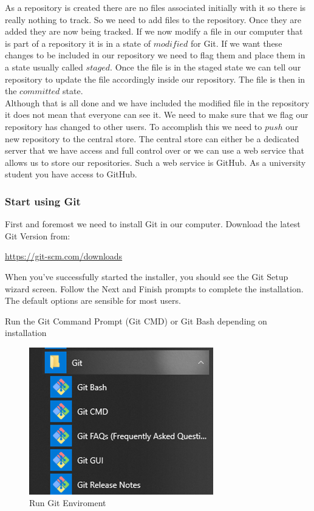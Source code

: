 \documentclass[
]{book}
\begin{document}
As a repository is created there are no files associated initially with it so there is really nothing to track. So we need to add files to the repository. Once they are added they are now being tracked. If we now modify a file in our computer that is part of a repository it is in a state of \(modified\) for Git. If we want these changes to be included in our repository we need to flag them and place them in a state usually called \(staged\). Once the file is in the staged state we can tell our repository to update the file accordingly inside our repository. The file is then in the \(committed\) state.\\
Although that is all done and we have included the modified file in the repository it does not mean that everyone can see it. We need to make sure that we flag our repository has changed to other users. To accomplish this we need to \(push\) our new repository to the central store.
The central store can either be a dedicated server that we have access and full control over or we can use a web service that allows us to store our repositories. Such a web service is GitHub.
As a university student you have access to GitHub.

\hypertarget{start-using-git}{%
\subsubsection*{Start using Git}\label{start-using-git}}

First and foremost we need to install Git in our computer. Download the latest Git Version from:

\url{https://git-scm.com/downloads}

When you've successfully started the installer, you should see the Git Setup wizard screen. Follow the Next and Finish prompts to complete the installation. The default options are sensible for most users.

Run the Git Command Prompt (Git CMD) or Git Bash depending on installation

\begin{figure}

{\centering \includegraphics[width=0.6\linewidth]{images/Git folder} 

}

\caption{Run Git Enviroment}\label{fig:unnamed-chunk-4}
\end{figure}
\end{document}
